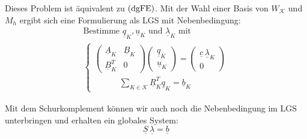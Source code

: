 Dieses Problem ist äquivalent zu $ \operatorname{(dgFE)} $. Mit der Wahl einer Basis von $ W_\mathcal{K} $ und $ M_h $ ergibt sich eine Formulierung als LGS mit Nebenbedingung:
\begin{gather*}
	\text{Bestimme } \underline{q}_K, \underline{u}_K \text{ und } \underline{\lambda}_K \text{ mit}\\
	\begin{cases}
		\begin{pmatrix}
			\underline{A}_K & \underline{B}_K \\
			\underline{B}_K^T & 0
		\end{pmatrix}
		\begin{pmatrix}
			\underline{q}_K\\
			\underline{u}_K
		\end{pmatrix}
		= \begin{pmatrix}
			\underline{c} \, \underline{\lambda}_K \\
			0
		\end{pmatrix}\\
		\qquad \quad \sum_{K \in \mathcal{K}} \underline{R}_K^T \underline{q}_K = \underline{b}_K		
	\end{cases}
\end{gather*}  

Mit dem Schurkomplement können wir auch noch die Nebenbedingung im LGS unterbringen und erhalten ein globales System:
\[
	\underline{S} \, \underline{\lambda} = \underline{b}
\]



